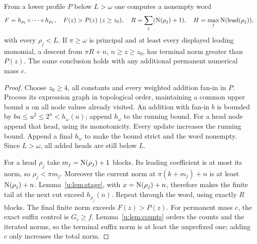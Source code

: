 \begin{lemma}\label{u:lem:reserve}
From a lower profile $P$ below $L>\omega$ one computes a nonempty word
\begin{equation}
 F=h_{\rho_l}\circ\cdots\circ h_{\rho_1},\quad
 F(z)>P(z)\ (z\ge z_0),\quad
 R=\sum_j(\operatorname{N}(\rho_j)+1),\quad
 H=\max_j\operatorname{N}(\operatorname{lead}(\rho_j)),          \label{u:display:5-2}
\end{equation}
with every $\rho_j<L$. If $\pi\ge\omega$ is principal and at least every
displayed leading monomial, a descent from $\pi R+n$, $n\ge z\ge z_0$,
has terminal norm greater than $P(z)$. The same conclusion holds with any
additional permanent numerical mass $c$.
\end{lemma}
\begin{proof}
Choose $z_0\ge4$, all constants and every weighted addition fan-in in $P$.
Process its expression graph in topological order, maintaining a common
upper bound $u$ on all node values already visited. An addition with fan-in
$b$ is bounded by $bu\le u^2\le2^u<h_\omega(u)$; append $h_\omega$ to the
running bound. For a head node append that head, using its monotonicity.
Every update increases the running bound. Append a final $h_\omega$ to
make the bound strict and the word nonempty. Since $L>\omega$, all added
heads are still below $L$.

For a head $\rho_j$ take $m_j=\operatorname{N}(\rho_j)+1$ blocks. Its leading
coefficient is at most its norm, so $\rho_j<\pi m_j$. Moreover the
current norm at $\pi(k+m_j)+n$ is at least $\operatorname{N}(\rho_j)+n$.
Lemma~\ref{u:lem:stage}, with $x=\operatorname{N}(\rho_j)+n$, therefore makes the
finite tail at the next cut exceed $h_{\rho_j}(n)$. Repeat through the
word, using exactly $R$ blocks. The final finite norm exceeds $F(z)>P(z)$.
For permanent mass $c$, the exact suffix control is $G_c\ge f$.
Lemma~\ref{u:lem:counts} orders the counts and the iterated norms, so the
terminal suffix norm is at least the unprefixed one; adding $c$ only
increases the total norm.
\end{proof}

